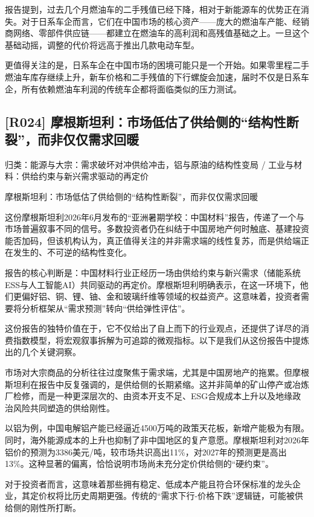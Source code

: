 \documentclass[11pt]{ctexart}
\begin{document}
报告提到，过去几个月燃油车的二手残值已经下降，相对于新能源车的优势正在消失。对于日系车企而言，它们在中国市场的核心资产——庞大的燃油车产能、经销商网络、零部件供应链——都建立在燃油车的高利润和高残值基础之上。一旦这个基础动摇，调整的代价将远高于推出几款电动车型。

更值得关注的是，日系车企在中国市场的困境可能只是一个开始。如果零里程二手燃油车库存继续上升，新车价格和二手残值的下行螺旋会加速，届时不仅是日系车企，所有依赖燃油车利润的传统车企都将面临类似的压力测试。

\subsection{[R024] 摩根斯坦利：市场低估了供给侧的“结构性断裂”，而非仅仅需求回暖}
{\small\color{refgray}归类：能源与大宗：需求破坏对冲供给冲击，铝与原油的结构性变局 / 工业与材料：供给约束与新兴需求驱动的再定价}

摩根斯坦利：市场低估了供给侧的“结构性断裂”，而非仅仅需求回暖

这份摩根斯坦利2026年6月发布的“亚洲暑期学校：中国材料”报告，传递了一个与市场普遍叙事不同的信号。多数投资者仍在纠结于中国房地产何时触底、基建投资能否加码，但该机构认为，真正值得关注的并非需求端的线性复苏，而是供给端正在发生的、不可逆的结构性变化。

报告的核心判断是：中国材料行业正经历一场由供给约束与新兴需求（储能系统ESS与人工智能AI）共同驱动的再定价。摩根斯坦利明确表示，在这一环境下，他们更偏好铝、铜、锂、铀、金和玻璃纤维等领域的权益资产。这意味着，投资者需要将分析框架从“需求预测”转向“供给弹性评估”。

这份报告的独特价值在于，它不仅给出了自上而下的行业观点，还提供了详尽的消费指数模型，将宏观叙事拆解为可追踪的微观指标。以下是我们从这份报告中提炼出的几个关键洞察。

市场对大宗商品的分析往往过度聚焦于需求端，尤其是中国房地产的拖累。但摩根斯坦利在报告中反复强调的，是供给侧的长期紧缩。这并非简单的矿山停产或冶炼厂检修，而是一种更深层次的、由资本开支不足、ESG合规成本上升以及地缘政治风险共同塑造的供给刚性。

以铝为例，中国电解铝产能已经逼近4500万吨的政策天花板，新增产能极为有限。同时，海外能源成本的上升也抑制了非中国地区的复产意愿。摩根斯坦利对2026年铝价的预测为3386美元/吨，较市场共识高出11\%，对2027年的预测更是高出13\%。这种显著的偏离，恰恰说明市场尚未充分定价供给侧的“硬约束”。

对于投资者而言，这意味着那些拥有稳定、低成本产能且符合环保标准的龙头企业，其定价权将比历史周期更强。传统的“需求下行-价格下跌”逻辑链，可能被供给侧的刚性所打断。
\end{document}
